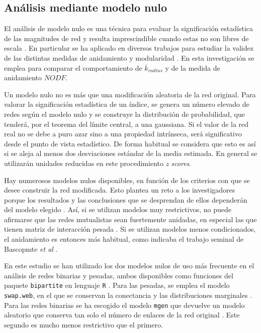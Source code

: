 \subsection{Análisis mediante modelo nulo}
\label{sec:nullmodels}

El análisis de modelo nulo es una técnica para evaluar la significación estadística de las magnitudes de red y resulta imprescindible cuando estas no son libres de escala \cite{gotelli1996null}. En particular se ha aplicado en diversos trabajos para estudiar la validez de las distintas medidas de anidamiento \cite{ulrich2013pattern, feng2014heterogeneity} y modularidad \cite{fortuna2010nestedness, mello2011modularity}. En esta investigación se emplea para comparar el comportamiento de $\overline k_{radius}$ y de la medida de anidamiento $NODF$.

Un modelo nulo no es más que una modificación aleatoria de la red original. Para valorar la significación estadística de un índice, se genera un
número elevado de redes según el modelo nulo y se construye la distribución de probabilidad, que tenderá, por el teorema del límite central, a una gaussiana. Si el valor de la red real no se debe a puro azar sino a una propiedad intrínseca, será significativo desde el punto de vista estadístico. De forma habitual se considera que esto es así
si se aleja al menos dos desviaciones estándar de la media estimada. En general se utilizarán unidades reducidas en este procedimiento \textit{z scores}.

Hay numerosos modelos nulos disponibles, en función de los criterios con que se desee construir la red modificada. Esto plantea un reto a los investigadores porque los resultados y las conclusiones que se desprendan de ellos dependerán del modelo elegido \cite{ulrich2007null,gotelli2012statistical}. Así, si se utilizan modelos muy restrictivos, no puede afirmarse que las redes mutualistas sean fuertemente anidadas, en especial las que tienen matriz de interacción pesada \cite{joppa2010nestedness, staniczenko2013ghost}. Si se utilizan modelos menos condicionados, el anidamiento es entonces más habitual, como indicaba el trabajo seminal de Bascopmte \textit{et al} \cite{bascompte2003nested}.

En este estudio se han utilizado los dos modelos nulos de uso más frecuente en el análisis de redes binarias y pesadas, ambos disponibles como funciones del paquete \texttt{bipartite} en lenguaje \texttt{R} \cite{dormann2008introducing}. Para las pesadas, se emplea el modelo \texttt{swap.web}, en el que se conservan la conectancia y las distribuciones marginales \cite{ dormann2009indices}. Para las redes binarias se ha escogido el modelo \texttt{mgen} que devuelve un modelo aleatorio que conserva tan solo el número de enlaces de la red original \cite{vazquez2009evaluating}. Este segundo es mucho menos restrictivo que el primero.

